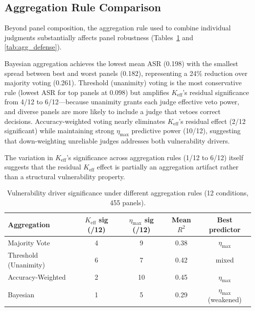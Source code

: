 \documentclass[11pt,a4paper]{article}
\begin{document}
\subsection{Aggregation Rule Comparison}
\label{sec:aggregation}

Beyond panel composition, the aggregation rule used to combine individual judgments substantially affects panel robustness (Tables~\ref{tab:agg_drivers} and \ref{tab:agg_defense}).

Bayesian aggregation achieves the lowest mean ASR (0.198) with the smallest spread between best and worst panels (0.182), representing a 24\% reduction over majority voting (0.261).
Threshold (unanimity) voting is the most conservative rule (lowest ASR for top panels at 0.098) but amplifies $K_{\mathrm{eff}}$'s residual significance from 4/12 to 6/12---because unanimity grants each judge effective veto power, and diverse panels are more likely to include a judge that vetoes correct decisions.
Accuracy-weighted voting nearly eliminates $K_{\mathrm{eff}}$'s residual effect (2/12 significant) while maintaining strong $\eta_{\max}$ predictive power (10/12), suggesting that down-weighting unreliable judges addresses both vulnerability drivers.

The variation in $K_{\mathrm{eff}}$'s significance across aggregation rules (1/12 to 6/12) itself suggests that the residual $K_{\mathrm{eff}}$ effect is partially an aggregation artifact rather than a structural vulnerability property.

\begin{table}[t]
\centering
\caption{Vulnerability driver significance under different aggregation rules (12 conditions, 455 panels).}
\label{tab:agg_drivers}
\small
\begin{tabular}{lcccc}
\toprule
\textbf{Aggregation} & $K_{\mathrm{eff}}$ \textbf{sig (/12)} & $\eta_{\max}$ \textbf{sig (/12)} & \textbf{Mean $R^2$} & \textbf{Best predictor} \\
\midrule
Majority Vote & 4 & 9 & 0.38 & $\eta_{\max}$ \\
Threshold (Unanimity) & 6 & 7 & 0.42 & mixed \\
Accuracy-Weighted & 2 & 10 & 0.45 & $\eta_{\max}$ \\
Bayesian & 1 & 5 & 0.29 & $\eta_{\max}$ (weakened) \\
\bottomrule
\end{tabular}
\end{table}
\end{document}
